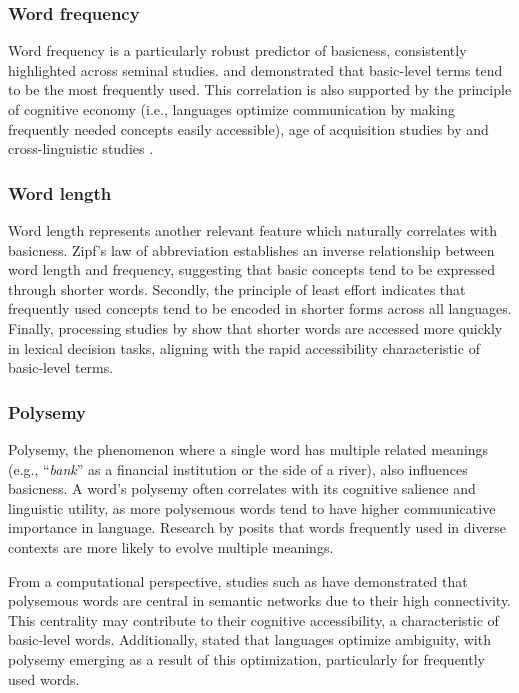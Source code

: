 \documentclass[preprint,12pt,authoryear]{elsarticle}
\begin{document}
\subsubsection{Word frequency}
Word frequency is a particularly robust predictor of basicness, consistently highlighted across seminal studies. \citet{brown_how_1958} and \citet{rosch_basic_1976} demonstrated that basic-level terms tend to be the most frequently used. This correlation is also supported by the principle of cognitive economy (i.e., languages optimize communication by making frequently needed concepts easily accessible), age of acquisition studies by \citet{morrison_age_1997} and cross-linguistic studies \cite{riviere_principles_1975,majid_cross-linguistic_2008}.

\subsubsection{Word length}
Word length represents another relevant feature which naturally correlates with basicness. Zipf's law of abbreviation \cite{zipf_psycho-biology_1935} establishes an inverse relationship between word length and frequency, suggesting that basic concepts tend to be expressed through shorter words. Secondly, the principle of least effort \cite{chao_human_1950} indicates that frequently used concepts tend to be encoded in shorter forms across all languages. Finally, processing studies by \citet{bybee_language_2010} show that shorter words are accessed more quickly in lexical decision tasks, aligning with the rapid accessibility characteristic of basic-level terms.

\subsubsection{Polysemy}
Polysemy, the phenomenon where a single word has multiple related meanings (e.g., ``\textit{bank}'' as a financial institution or the side of a river), also influences basicness. A word's polysemy often correlates with its cognitive salience and linguistic utility, as more polysemous words tend to have higher communicative importance in language. Research by \citet{zipf_meaning-frequency_1945} posits that words frequently used in diverse contexts are more likely to evolve multiple meanings.

From a computational perspective, studies such as \cite{mccarthy_finding_2004} have demonstrated that polysemous words are central in semantic networks due to their high connectivity. This centrality may contribute to their cognitive accessibility, a characteristic of basic-level words. Additionally, \citet{piantadosi_communicative_2012} stated that languages optimize ambiguity, with polysemy emerging as a result of this optimization, particularly for frequently used words.
\end{document}
